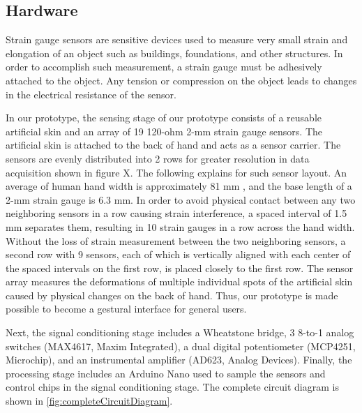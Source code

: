 \documentclass{sigchi}
\begin{document}
\subsection{Hardware} 
Strain gauge sensors are sensitive devices used to measure very small strain and elongation of an object such as buildings, foundations, and other structures. In order to accomplish such measurement, a strain gauge must be adhesively attached to the object. Any tension or compression on the object leads to changes in the electrical resistance of the sensor.



In our prototype, the sensing stage of our prototype consists of a reusable artificial skin and an array of 19 120-ohm 2-mm strain gauge sensors. The artificial skin is attached to the back of hand and acts as a sensor carrier. The sensors are evenly distributed into 2 rows for greater resolution in data acquisition shown in figure X. The following explains for such sensor layout. An average of human hand width is approximately 81 mm \cite{Kulaksiz2002257}, and the base length of a 2-mm strain gauge is 6.3 mm. In order to avoid physical contact between any two neighboring sensors in a row causing strain interference, a spaced interval of 1.5 mm separates them, resulting in 10 strain gauges in a row across the hand width. Without the loss of strain measurement between the two neighboring sensors, a second row with 9 sensors, each of which is vertically aligned with each center of the spaced intervals on the first row, is placed closely to the first row. The sensor array measures the deformations of multiple individual spots of the artificial skin caused by physical changes on the back of hand. Thus, our prototype is made possible to become a gestural interface for general users.

Next, the signal conditioning stage includes a Wheatstone bridge, 3 8-to-1 analog switches (MAX4617, Maxim Integrated), a dual digital potentiometer (MCP4251, Microchip), and an instrumental amplifier (AD623, Analog Devices). Finally, the processing stage includes an Arduino Nano used to sample the sensors and control chips in the signal conditioning stage. The complete circuit diagram is shown in \autoref{fig:completeCircuitDiagram}.
\end{document}
